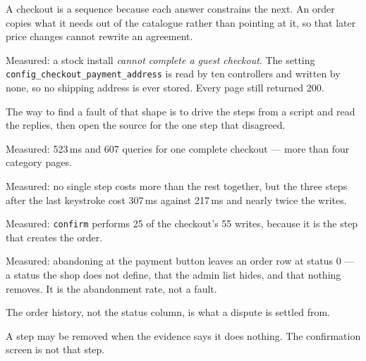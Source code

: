 \begin{chaptersummary}
\begin{tight}
  \item A checkout is a sequence because each answer constrains the next. An
        order copies what it needs out of the catalogue rather than pointing at
        it, so that later price changes cannot rewrite an agreement.
  \item Measured: a stock install \emph{cannot complete a guest checkout}. The
        setting \texttt{config\_checkout\_payment\_address} is read by ten
        controllers and written by none, so no shipping address is ever stored.
        Every page still returned 200.
  \item The way to find a fault of that shape is to drive the steps from a
        script and read the replies, then open the source for the one step that
        disagreed.
  \item Measured: 523\,ms and 607 queries for one complete checkout --- more
        than four category pages.
  \item Measured: no single step costs more than the rest together, but the
        three steps after the last keystroke cost 307\,ms against 217\,ms and
        nearly twice the writes.
  \item Measured: \texttt{confirm} performs 25 of the checkout's 55 writes,
        because it is the step that creates the order.
  \item Measured: abandoning at the payment button leaves an order row at
        status 0 --- a status the shop does not define, that the admin list
        hides, and that nothing removes. It is the abandonment rate, not a
        fault.
  \item The order history, not the status column, is what a dispute is settled
        from.
  \item A step may be removed when the evidence says it does nothing. The
        confirmation screen is not that step.
\end{tight}
\end{chaptersummary}

